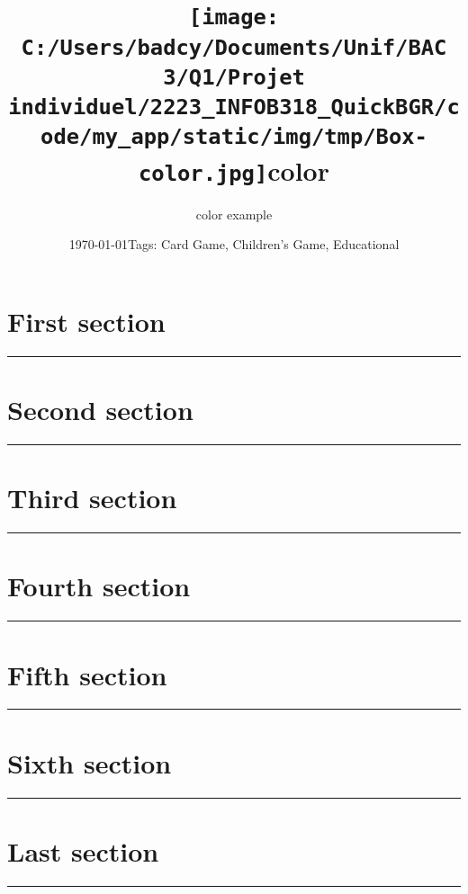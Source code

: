 \documentclass{scrartcl}%
\title{\texttt{[image: C:/Users/badcy/Documents/Unif/BAC 3/Q1/Projet individuel/2223\_INFOB318\_QuickBGR/code/my\_app/static/img/tmp/Box-color.jpg]}\break color }%
\author{color example}%
\date{\today \break Tags: Card Game, Children's Game, Educational}%
\begin{document}
%
\normalsize%
\maketitle\thispagestyle{header}%
\pagestyle{header}%
\sectionfont{\color{blue}}%
\subsectionfont{\color{blue}}%
\subsubsectionfont{\color{blue}}%
\section{ First section
}%
\label{sec:Firstsection}%
\textcolor{blue}{\rule{18cm}{0.07cm}}\break

%
\sectionfont{\color{mygreen}}%
\subsectionfont{\color{mygreen}}%
\subsubsectionfont{\color{mygreen}}%
\section{ Second section
}%
\label{sec:Secondsection}%
\textcolor{mygreen}{\rule{18cm}{0.07cm}}\break

%
\sectionfont{\color{red}}%
\subsectionfont{\color{red}}%
\subsubsectionfont{\color{red}}%
\section{ Third section
}%
\label{sec:Thirdsection}%
\textcolor{red}{\rule{18cm}{0.07cm}}\break

%
\sectionfont{\color{cyan}}%
\subsectionfont{\color{cyan}}%
\subsubsectionfont{\color{cyan}}%
\section{ Fourth section
}%
\label{sec:Fourthsection}%
\textcolor{cyan}{\rule{18cm}{0.07cm}}\break

%
\sectionfont{\color{orange}}%
\subsectionfont{\color{orange}}%
\subsubsectionfont{\color{orange}}%
\section{ Fifth  section
}%
\label{sec:Fifthsection}%
\textcolor{orange}{\rule{18cm}{0.07cm}}\break

%
\sectionfont{\color{blue}}%
\subsectionfont{\color{blue}}%
\subsubsectionfont{\color{blue}}%
\section{ Sixth section
}%
\label{sec:Sixthsection}%
\textcolor{blue}{\rule{18cm}{0.07cm}}\break

%
\sectionfont{\color{mygreen}}%
\subsectionfont{\color{mygreen}}%
\subsubsectionfont{\color{mygreen}}%
\section{ Last section}%
\label{sec:Lastsection}%
\textcolor{mygreen}{\rule{18cm}{0.07cm}}\break

%
\end{document}
